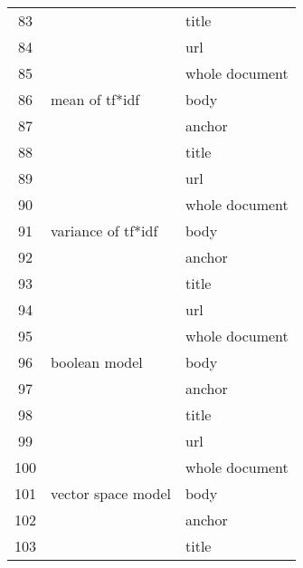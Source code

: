 \begin{longtable}{cll}
83         &                                                     & title          \\
84         &                                                     & url            \\
85         &                                                     & whole document \\
\midrule86         & mean of tf*idf                                      & body           \\
87         &                                                     & anchor         \\
88         &                                                     & title          \\
89         &                                                     & url            \\
90         &                                                     & whole document \\
\midrule91         & variance of tf*idf                                  & body           \\
92         &                                                     & anchor         \\
93         &                                                     & title          \\
94         &                                                     & url            \\
95         &                                                     & whole document \\
\midrule96         & boolean model                                       & body           \\
97         &                                                     & anchor         \\
98         &                                                     & title          \\
99         &                                                     & url            \\
100        &                                                     & whole document \\
\midrule101        & vector space model                                  & body           \\
102        &                                                     & anchor         \\
103        &                                                     & title          \\

\end{longtable}
